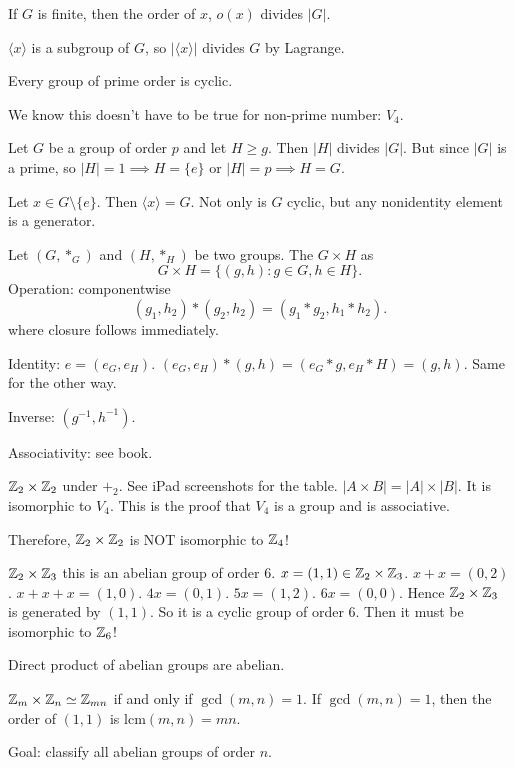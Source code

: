 \documentclass[class=article,crop=false]{standalone}
\begin{document}
\begin{thm}[]
	If $ G$ is finite, then the order of  $ x$, $o(x)$ divides  $ |G|$.
\end{thm}
\begin{prf}
$ \langle x \rangle$ is a subgroup of $ G$, so  $ |\langle x \rangle|$ divides $ G$ by Lagrange.
\end{prf}

\begin{thm}[10.11]
Every group of prime order is cyclic.
\end{thm}
\begin{eg}[]
We know this doesn't have to be true for non-prime number: $ V_4$.
\end{eg}
\begin{prf}
Let $ G$ be a group of order  $ p$ and let  $ H\geq g$. Then  $ |H|$ divides  $ |G|$. But since  $ |G|$ is a prime, so  $ |H|=1 \implies H=\{e\} $ or  $ |H|=p \implies H=G$.
\end{prf}

\begin{claim}[]
Let $ x \in G\setminus \{e\} $. Then $ \langle x \rangle =G$. Not only is $ G$ cyclic, but any nonidentity element is a generator.
\end{claim}

\begin{defn}
	Let $ (G,*_G)$ and  $ (H,*_H)$ be two groups. The  $ G \times H$ as
	\[
		G \times H= \{(g,h):g \in G, h \in H\} 
	.\] 
	Operation: componentwise
	\[
		(g_1,h_2) * (g_2,h_2) = (g_1*g_2,h_1*h_2)
	.\] 
	where closure follows immediately.
	
	Identity: $ e = (e_G,e_H)$.  $ (e_G,e_H)*(g,h) = (e_G*g,e_H*H)=(g,h)$. Same for the other way.

	Inverse:  $ (g^{-1},h^{-1})$.

	Associativity: see book.
\end{defn}

\begin{eg}[]
$ \mathbb{Z}_2 \times \mathbb{Z}_2$ under $ +_2$. See iPad screenshots for the table. $ |A \times B|=|A| \times |B|$. It is isomorphic to $ V_4$. This is the proof that $ V_4$ is a group and is associative. 

Therefore, $ \mathbb{Z}_2 \times \mathbb{Z}_2$ is NOT isomorphic to $ \mathbb{Z}_4$!
\end{eg}
\begin{eg}[]
	$ \mathbb{Z}_2 \times \mathbb{Z}_3$ this is an abelian group of order 6. $ x=(1,1) \in \mathbb{Z}_2 \times \mathbb{Z}_3$. $ x + x = (0,2)$.  $ x+x+x=(1,0)$.  $ 4x = (0,1)$.  $ 5x=(1,2)$.  $ 6x=(0,0)$. Hence $ \mathbb{Z}_2 \times \mathbb{Z}_3$ is generated by $(1,1)$. So it is a cyclic group of order 6. Then it must be isomorphic to  $ \mathbb{Z}_6$! 
\end{eg}
\begin{claim}[]
Direct product of abelian groups are abelian.
\end{claim}
\begin{claim}[]
	$ \mathbb{Z}_m \times \mathbb{Z}_n \simeq \mathbb{Z}_{mn}$ if and only if $ \gcd ( m,n)=1 $. If $ \gcd ( m,n) =1$, then the order of $ (1,1)$ is  lcm$(m,n)=mn $.
\end{claim}

Goal: classify all abelian groups of order $ n$.
\end{document}
